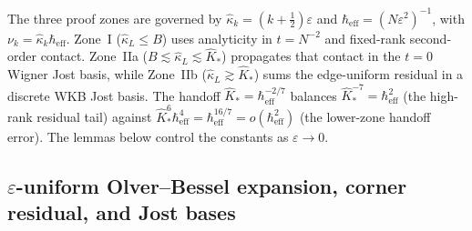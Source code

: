 \documentclass[11pt]{article}
\theoremstyle{definition}
\theoremstyle{remark}
\newcommand{\heff}{\hbar_{\mathrm{eff}}}
\renewcommand{\_}{\oldunderscore\penalty0\hskip0pt\relax}
\begin{document}
The three proof zones are governed by $\hat\kappa_k=(k+\tfrac12)\varepsilon$
  and $\heff=(N\varepsilon^2)^{-1}$, with $\nu_k=\hat\kappa_k\heff$.
  Zone~I ($\hat\kappa_L\le B$) uses analyticity in $t=N^{-2}$
  and fixed-rank second-order contact. Zone~IIa
  ($B\lesssim\hat\kappa_L\lesssim\hat K_*$) propagates that contact
  in the $t=0$ Wigner Jost basis, while Zone~IIb
  ($\hat\kappa_L\gtrsim\hat K_*$) sums the edge-uniform residual
  in a discrete WKB Jost basis. The handoff
  $\hat K_*=\heff^{-2/7}$ balances $\hat K_*^{-7}=\heff^2$
  (the high-rank residual tail) against
  $\hat K_*^6\heff^4=\heff^{16/7}=o(\heff^2)$
  (the lower-zone handoff error). The lemmas below
  control the constants as $\varepsilon\to0$.

\subsection{\texorpdfstring{$\varepsilon$}{epsilon}-uniform Olver--Bessel expansion, corner residual, and Jost bases}
\end{document}
